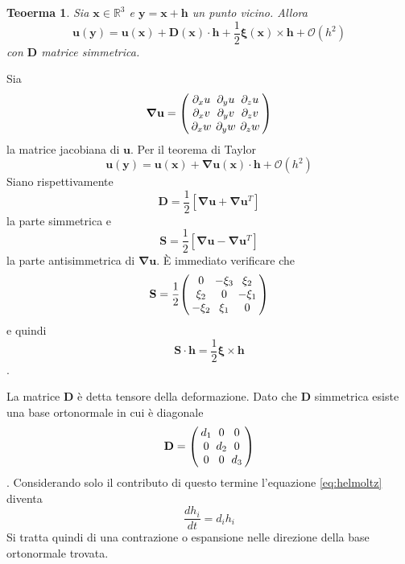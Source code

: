 \documentclass{book}
\newtheorem{theorem}{Teoerma}[section]
\newenvironment{proof}[1][Dimostrazione]{\begin{trivlist}
\item[\hskip \labelsep {\bfseries #1}]}{\end{trivlist}}
\newcommand{\qed}{\nobreak \ifvmode \relax \else
    \ifdim\lastskip<1.5em \hskip-\lastskip
     \hskip1.5em plus0em minus0.5em \fi \nobreak
     \vrule height0.75em width0.5em depth0.25em\fi}
\newcommand{\Nabla}{\boldsymbol{\nabla}}
\begin{document}
\begin{theorem}
Sia $\mathbf{x} \in \mathbb{R}^3$ e $\mathbf{y} = \mathbf{x} + \mathbf{h}$ un punto vicino. Allora 
\begin{equation}\label{eq:helmoltz}
\mathbf{u}(\mathbf{y}) = \mathbf{u}(\mathbf{x}) + \mathbf{D}(\mathbf{x}) \cdot \mathbf{h} + \frac{1}{2} \boldsymbol{\xi}(\mathbf{x}) \times \mathbf{h} + \mathcal{O} ( h^2)
\end{equation}
con $\mathbf{D}$ matrice simmetrica.
\end{theorem}
\begin{proof}
Sia
\begin{equation}
\Nabla\mathbf{u}={\setlength\arraycolsep{2pt} 
\left(\begin{array}{ccc} 
\partial_x u&  \partial_y u &\partial_z u\\ 
\partial_x v&  \partial_y v &\partial_z v\\ 
\partial_x w&  \partial_y w &\partial_z w\\
\end{array}\right) 
}
\end{equation}
la matrice jacobiana di $\mathbf{u}$.
Per il teorema di Taylor
$$\mathbf{u}(\mathbf{y}) = \mathbf{u}(\mathbf{x}) + \Nabla\mathbf{u}(\mathbf{x}) \cdot \mathbf{h} + \mathcal{O} ( h^2)$$
Siano rispettivamente
$$\mathbf{D} = \frac{1}{2} [ \Nabla\mathbf{u} + \Nabla\mathbf{u} ^T]$$
la parte simmetrica e
$$\mathbf{S} = \frac{1}{2} [ \Nabla\mathbf{u} - \Nabla\mathbf{u} ^T]$$
la parte antisimmetrica di $ \Nabla\mathbf{u}$.
\`E immediato verificare che
\begin{equation}
\mathbf{S}=\frac{1}{2}{\setlength\arraycolsep{2pt} 
\left(\begin{array}{ccc} 
0&  -\xi_3 &\xi_2\\ 
\xi_2&  0 &-\xi_1\\ 
-\xi_2&  \xi_1 &0\\
\end{array}\right) 
}
\end{equation}
e quindi
$$\mathbf{S} \cdot \mathbf{h} = \frac{1}{2} \boldsymbol{\xi} \times \mathbf{h}$$.
\qed%
\end{proof}

La matrice $\mathbf{D}$ è detta tensore della deformazione. Dato che $\mathbf{D}$ simmetrica esiste una base ortonormale in cui è diagonale
\begin{equation}
\mathbf{D}={\setlength\arraycolsep{2pt} 
\left(\begin{array}{ccc} 
d_1 & 0 & 0 \\ 
0 & d_2 & 0 \\ 
0 & 0 & d_3 \\
\end{array}\right) 
}
\end{equation}.
Considerando solo il contributo di questo termine l'equazione \ref{eq:helmoltz} diventa 
$$\frac{d h_i}{dt} = d_i h_i$$
Si tratta quindi di una contrazione o espansione nelle direzione della base ortonormale trovata.
\end{document}
